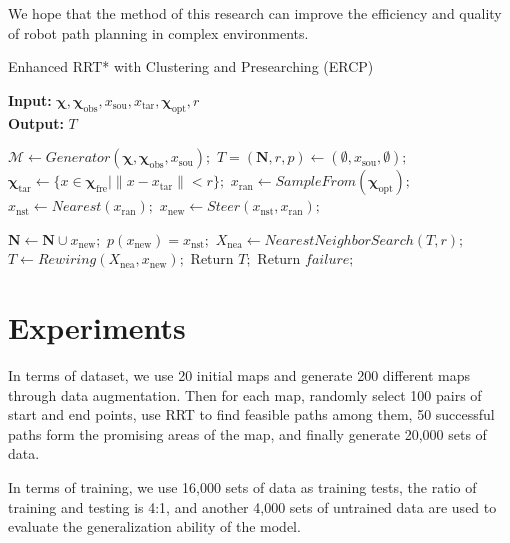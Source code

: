 \documentclass[smallcondensed]{svjour3}     %
\begin{document}
We hope that the method of this research can improve the efficiency and quality of robot path planning in complex environments.

\begin{algorithm}
	\caption{Enhanced RRT* with Clustering and Presearching (ERCP)}
	\label{algorithm: ercp-RRT*}
	\hspace*{0.02in} {\bf Input:} $\bm{\chi}, \bm{\chi}_{\textrm{obs}}, x_{\textrm{sou}}, x_{\textrm{tar}}, \bm{\chi}_{\textrm{opt}}, r$ \\
	\hspace*{0.02in} {\bf Output:} $T$
	\begin{algorithmic}[1]
		\State $\mathcal{M} \leftarrow Generator(\bm{\chi}, \bm{\chi}_{\textrm{obs}}, x_{\textrm{sou}}); $
		\State $T = (\mathbf{N}, r, p) \leftarrow (\emptyset, x_{\textrm{sou}}, \emptyset) ;$
		\State $\bm{\chi}_{\textrm{tar}} \leftarrow \{x \in \bm{\chi}_{\textrm{fre}} \vert \lVert x - x_{\textrm{tar}} \rVert < r\} ;$
			\State $x_{\textrm{ran}} \leftarrow SampleFrom(\bm{\chi}_{\textrm{opt}}) ;$
			\State $x_{\textrm{nst}} \leftarrow Nearest(x_{\textrm{ran}}) ;$
			\State $x_{\textrm{new}} \leftarrow Steer(x_{\textrm{nst}}, x_{\textrm{ran}}) ;$

				\State $\mathbf{N} \leftarrow \mathbf{N} \cup x_{\textrm{new}} ;$
				\State $p(x_{\textrm{new}}) = x_{\textrm{nst}} ;$
				\State $X_{\textrm{nea}} \leftarrow NearestNeighborSearch(T, r) ;$
				\State $T \leftarrow Rewiring(X_{\textrm{nea}}, x_{\textrm{new}}) ;$
					\State Return $T ;$
				\EndIf
			\EndIf
		\EndFor
		\State Return $failure ;$
	\end{algorithmic}
\end{algorithm}

\section{Experiments}\label{section: Experiments}
In terms of dataset, we use 20 initial maps and generate 200 different maps through data augmentation. 
Then for each map, randomly select 100 pairs of start and end points, use RRT to find feasible paths among them, 50 successful paths form the promising areas of the map, and finally generate 20,000 sets of data.

In terms of training, we use 16,000 sets of data as training tests, the ratio of training and testing is 4:1, and another 4,000 sets of untrained data are used to evaluate the generalization ability of the model.
\end{document}
